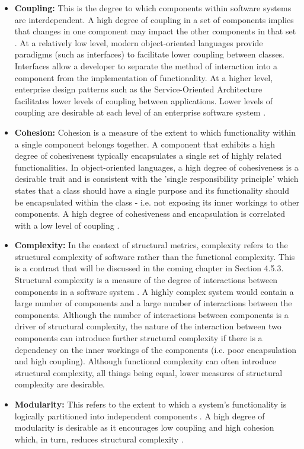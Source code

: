 \begin{itemize}
\item \textbf{Coupling:} This is the degree to which components within software systems are interdependent. A high degree of coupling in a set of components implies that changes in one component may impact the other components in that set \cite{parnas1972criteria}. At a relatively low level, modern object-oriented languages provide paradigms (such as interfaces) to facilitate lower coupling between classes. Interfaces allow a developer to separate the method of interaction into a component from the implementation of functionality. At a higher level, enterprise design patterns such as the Service-Oriented Architecture facilitates lower levels of coupling between applications. Lower levels of coupling are desirable at each level of an enterprise software system \cite{pressman2005software} \cite{chidamber1998managerial}.

\item \textbf{Cohesion:} Cohesion is a measure of the extent to which functionality within a single component belongs together. A component that exhibits a high degree of cohesiveness typically encapsulates a single set of highly related functionalities. In object-oriented languages, a high degree of cohesiveness is a desirable trait and is consistent with the 'single responsibility principle' which states that a class should have a single purpose and its functionality should be encapsulated within the class - i.e. not exposing its inner workings to other components\cite{fenton2014software}. A high degree of cohesiveness and encapsulation is correlated with a low level of coupling \cite{chidamber1998managerial}.

\item \textbf{Complexity:} In the context of structural metrics, complexity refers to the structural complexity of software rather than the functional complexity. This is a contrast that will be discussed in the coming chapter in Section 4.5.3. Structural complexity is a measure of the degree of interactions between components in a software system \cite{fenton2014software}. A highly complex system would contain a large number of components and a large number of interactions between the components. Although the number of interactions between components is a driver of structural complexity, the nature of the interaction between two components can introduce further structural complexity if there is a dependency on the inner workings of the components (i.e. poor encapsulation and high coupling). Although functional complexity can often introduce structural complexity, all things being equal, lower measures of structural complexity are desirable.

\item \textbf{Modularity:} This refers to the extent to which a system's functionality is logically partitioned into independent components \cite{parnas1972criteria}. A high degree of modularity is desirable as it encourages low coupling and high cohesion which, in turn, reduces structural complexity \cite{parnas1972criteria} \cite{sullivan2001structure}.
\end{itemize}

